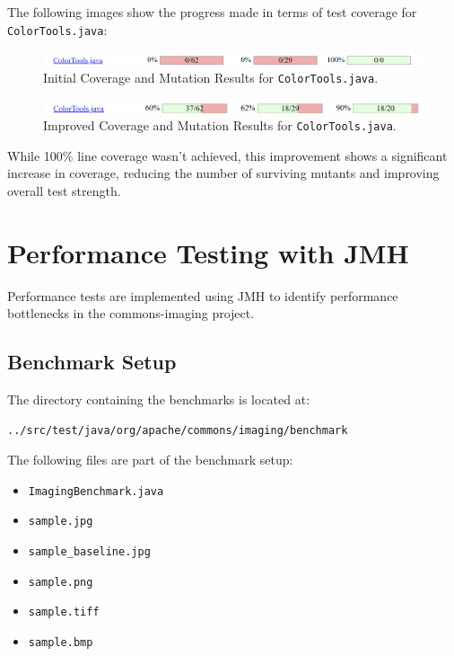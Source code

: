 \documentclass[a4paper,12pt]{report}
\begin{document}
\noindent The following images show the progress made in terms of test coverage for \texttt{ColorTools.java}:

\begin{figure}[H]
    \centering
    \includegraphics[width=1\textwidth]{Report_Img/pit_init.png}
    \caption{Initial Coverage and Mutation Results for \texttt{ColorTools.java}.}
    \label{fig:color_tools_initial}
\end{figure}

\begin{figure}[H]
    \centering
    \includegraphics[width=1\textwidth]{Report_Img/pit_final.png}
    \caption{Improved Coverage and Mutation Results for \texttt{ColorTools.java}.}
    \label{fig:color_tools_improved}
\end{figure}

\noindent While 100\% line coverage wasn't achieved, this improvement shows a significant increase in coverage, reducing the number of surviving mutants and improving overall test strength.

\newpage


\chapter{Performance Testing with JMH}
Performance tests are implemented using JMH to identify performance bottlenecks in the commons-imaging project.

\section{Benchmark Setup}
The directory containing the benchmarks is located at:

\begin{lstlisting}[language=bash]
../src/test/java/org/apache/commons/imaging/benchmark
\end{lstlisting}

The following files are part of the benchmark setup:
\begin{itemize}
    \item \texttt{ImagingBenchmark.java}
    \item \texttt{sample.jpg}
    \item \texttt{sample\_baseline.jpg}
    \item \texttt{sample.png}
    \item \texttt{sample.tiff}
    \item \texttt{sample.bmp}
\end{itemize}
\end{document}
